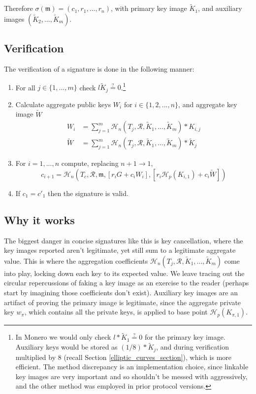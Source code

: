 Therefore \(\sigma(\mathfrak{m}) = (c_1, r_1, ..., r_n) \), with primary key image $\tilde{K}_1$, and auxiliary images $(\tilde{K}_2,...,\tilde{K}_{m})$.


\subsection*{Verification}

The verification of a signature is done in the following manner:

\begin{enumerate}
    \item For all $j \in \{1,...,m\}$ check $l \tilde{K}_j \stackrel{?}{=} 0$.\footnote{In Monero we would only check $l*\tilde{K}_1 \stackrel{?}{=} 0$ for the primary key image. Auxiliary keys would be stored as $(1/8)*\tilde{K}_j$, and during verification multiplied by 8 (recall Section \ref{elliptic_curves_section}), which is more efficient. The method discrepancy is an implementation choice, since linkable key images are very important and so shouldn't be messed with aggressively, and the other method was employed in prior protocol versions.}

    \item Calculate aggregate public keys $W_i$ for \(i \in \{1, 2, ..., n\}\), and aggregate key image $\tilde{W}$\vspace{.175cm}
    \begin{align*}
    W_i &= \sum^{m}_{j=1} \mathcal{H}_n(T_j, \mathcal{R}, \tilde{K}_1,...,\tilde{K}_{m})*K_{i,j}\\
    \tilde{W} &= \sum^{m}_{j=1} \mathcal{H}_n(T_j, \mathcal{R}, \tilde{K}_1,...,\tilde{K}_{m})*\tilde{K}_j
    \end{align*}{}

	\item For \(i = 1, ..., n\) compute, replacing \(n + 1 \rightarrow 1\),\vspace{.175cm}
	\[c_{i+1} = \mathcal{H}_n(T_c, \mathcal{R}, \mathfrak{m}, [r_i G + c_i W_i], [r_{i} \mathcal{H}_p(K_{i,1}) + c_i \tilde{W}])\]

	\item If \(c_1 = c'_1\) then the signature is valid.
\end{enumerate}


\subsection*{Why it works}

The biggest danger in concise signatures like this is key cancellation, where the key images reported aren't legitimate, yet still sum to a legitimate aggregate value. This is where the aggregation coefficients $\mathcal{H}_n(T_j, \mathcal{R}, \tilde{K}_1,...,\tilde{K}_{m})$ come into play, locking down each key to its expected value. We leave tracing out the circular repercussions of faking a key image as an exercise to the reader (perhaps start by imagining those coefficients don't exist). Auxiliary key images are an artifact of proving the primary image is legitimate, since the aggregate private key $w_{\pi}$, which contains all the private keys, is applied to base point $\mathcal{H}_p(K_{\pi,1})$.


